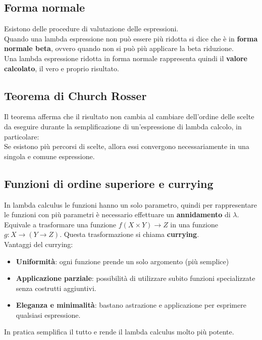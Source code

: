 \documentclass[12pt,a4paper]{article}
\begin{document}
\subsection{Forma normale}
Esistono delle procedure di valutazione delle espressioni.\\
Quando una lambda espressione non può essere più ridotta si dice che è in \textbf{forma normale beta}, ovvero quando non si può più applicare la beta riduzione.\\
Una lambda espressione ridotta in forma normale rappresenta quindi il \textbf{valore calcolato}, il vero e proprio risultato.

\subsection{Teorema di Church Rosser}
Il teorema afferma che il risultato non cambia al cambiare dell'ordine delle scelte da eseguire durante la semplificazione di un'espressione di lambda calcolo, in particolare:\\
Se esistono più percorsi di scelte, allora essi convergono necessariamente in una singola e comune espressione.

\subsection{Funzioni di ordine superiore e currying}
In lambda calculus le funzioni hanno un solo parametro, quindi per rappresentare le funzioni con più parametri è necessario effettuare un \textbf{annidamento} di $\lambda$.\\
Equivale a trasformare una funzione $f(X\times Y) \rightarrow Z$ in una funzione $g: X \rightarrow (Y \rightarrow Z)$. Questa trasformazione si chiama \textbf{currying}.\\
Vantaggi del currying:
\begin{itemize}
  \item \textbf{Uniformità}: ogni funzione prende un solo argomento (più semplice)
  \item \textbf{Applicazione parziale}: possibilità di utilizzare subito funzioni specializzate senza costrutti aggiuntivi.
  \item \textbf{Eleganza e minimalità}: bastano astrazione e applicazione per esprimere qualsiasi espressione.
\end{itemize}
In pratica semplifica il tutto e rende il lambda calculus molto più potente.
\end{document}
